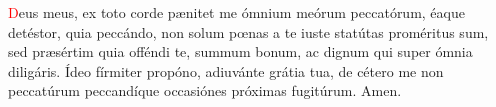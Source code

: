 \textcolor{red}{D}eus meus, ex toto corde p{\ae}nitet me ómnium meórum peccatórum, éaque detéstor, quia peccándo, non solum pœnas a te iuste statútas 
proméritus sum, sed pr{\ae}sértim quia offéndi te, summum bonum, ac dignum qui super ómnia diligáris. Ídeo fírmiter propóno, adiuvánte grátia tua, 
de cétero me non peccatúrum peccandíque occasiónes próximas fugitúrum. Amen.